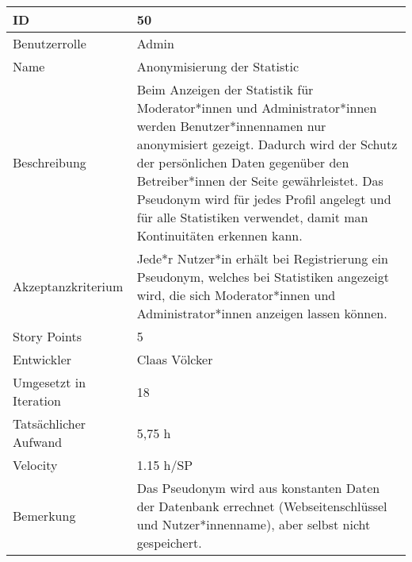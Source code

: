 \begin{tabularx}{\textwidth}{|p{}|X|}
	\hline
	ID & 50\\
	\hline
	Benutzerrolle & Admin\\
	\hline
	Name & Anonymisierung der Statistic\\
	\hline
	Beschreibung & Beim Anzeigen der Statistik für Moderator*innen und Administrator*innen werden Benutzer*innennamen nur anonymisiert gezeigt. Dadurch wird der Schutz der persönlichen Daten gegenüber den Betreiber*innen der Seite gewährleistet. Das Pseudonym wird für jedes Profil angelegt und für alle Statistiken verwendet, damit man Kontinuitäten erkennen kann.\\
	\hline
	Akzeptanzkriterium & Jede*r Nutzer*in erhält bei Registrierung ein Pseudonym, welches bei Statistiken angezeigt wird, die sich Moderator*innen und Administrator*innen anzeigen lassen können.\\
	\hline
	Story Points & 5\\
	\hline
	Entwickler & Claas Völcker\\
	\hline
	Umgesetzt in Iteration & 18\\
	\hline
	Tatsächlicher Aufwand & 5,75 h\\
	\hline
	Velocity & 1.15 h/SP\\
	\hline
	Bemerkung & Das Pseudonym wird aus konstanten Daten der Datenbank errechnet (Webseitenschlüssel und Nutzer*innenname), aber selbst nicht gespeichert.\\
	\hline
\end{tabularx}
\vspace{20pt}
